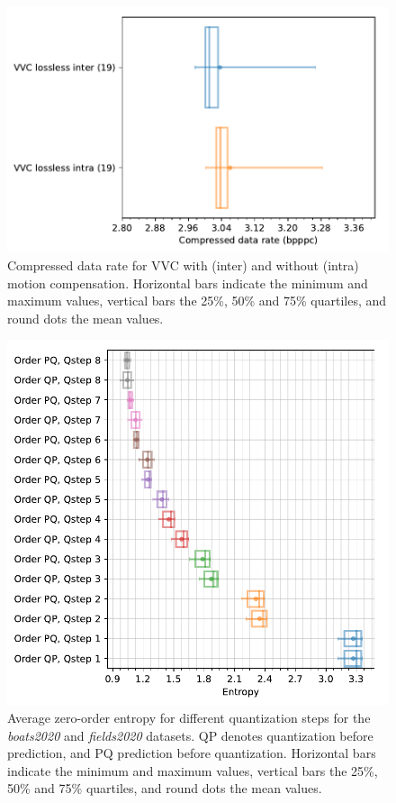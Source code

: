 \documentclass{class/technicalReportUAB}
\begin{document}
\begin{figure}[h]
\begin{center}
\includegraphics[width=0.6\linewidth]{./plots/extra/vvc_results.pdf}
\end{center}
\caption{Compressed data rate for VVC with (inter) and without (intra) motion compensation.
Horizontal bars indicate the minimum and maximum values, vertical bars the 25\%, 50\% and 75\% quartiles, and round dots the mean values.}
\label{fig:vvc}
\end{figure}

\begin{figure}[h]
\begin{center}
\includegraphics[width=0.7\linewidth]{./plots/extra/qp_pq_comparison.pdf}
\end{center}
\caption{Average zero-order entropy for different quantization steps for the \textit{boats2020} and \textit{fields2020} datasets.
QP denotes quantization before prediction, and PQ prediction before quantization.
Horizontal bars indicate the minimum and maximum values, vertical bars the 25\%, 50\% and 75\% quartiles, and round dots the mean values.}
\label{fig:qp_pq}
\end{figure}
% 
% 
% 
\end{document}
